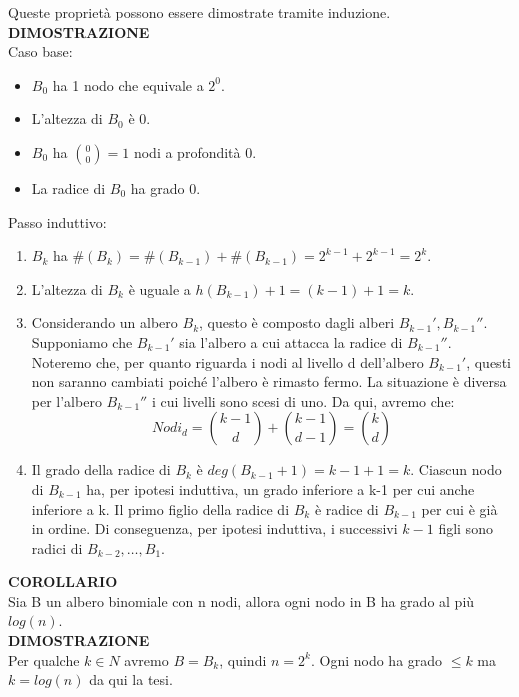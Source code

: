Queste proprietà possono essere dimostrate tramite induzione.\\
\textbf{DIMOSTRAZIONE}\\
Caso base:
\begin{itemize}
    \item $B_0$ ha 1 nodo che equivale a $2^0$.
    \item L'altezza di $B_0$ è 0.
    \item $B_0$ ha $\binom{0}{0}=1$ nodi a profondità 0.
    \item La radice di $B_0$ ha grado 0.
\end{itemize}
Passo induttivo:
\begin{enumerate}
    \item $B_k$ ha $\#(B_k)=\#(B_{k-1})+\#(B_{k-1}) = 2^{k-1}+2^{k-1}= 2^k$.
    \item L'altezza di $B_k$ è uguale a $h(B_{k-1})+1=(k-1)+1=k$.
    \item Considerando un albero $B_k$, questo è composto dagli alberi $B_{k-1}', B_{k-1}''$. Supponiamo che $B_{k-1}'$ sia l'albero a cui attacca la radice di $B_{k-1}''$. Noteremo che, per quanto riguarda i nodi al livello d dell'albero $B_{k-1}'$, questi non saranno cambiati poiché l'albero è rimasto fermo. La situazione è diversa per l'albero $B_{k-1}''$ i cui livelli sono scesi di uno. Da qui, avremo che:
    \[Nodi_d = \binom{k-1}{d}+\binom{k-1}{d-1} = \binom{k}{d}\]
    \item Il grado della radice di $B_k$ è $deg(B_{k-1}+1)=k-1+1=k$. Ciascun nodo di $B_{k-1}$ ha, per ipotesi induttiva, un grado inferiore a k-1 per cui anche inferiore a k. Il primo figlio della radice di $B_k$ è radice di $B_{k-1}$ per cui è già in ordine. Di conseguenza, per ipotesi induttiva, i successivi $k-1$ figli sono radici di $B_{k-2},\dots,B_1$. 
\end{enumerate}
\textbf{COROLLARIO}\\
Sia B un albero binomiale con n nodi, allora ogni nodo in B ha grado al più $log(n)$.\\
\textbf{DIMOSTRAZIONE}\\
Per qualche $k\in N $ avremo $B=B_k$, quindi $n=2^k.$ Ogni nodo ha grado $\leq k$ ma $k=log(n)$ da qui la tesi.

